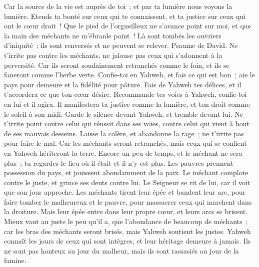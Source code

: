 \begin{multicols}{2}
Car la source de la vie est auprès de toi~; et par ta lumière nous voyons la lumière.
Etends ta bonté sur ceux qui te connaissent, et ta justice sur ceux qui ont le cœur droit~!
Que le pied de l'orgueilleux ne s'avance point sur moi, et que la main des méchants ne m'ébranle point~!
Là sont tombés les ouvriers d'iniquité~; ils sont renversés et ne peuvent se relever.
\VerseOne{}Psaume de David.  Ne t'irrite pas contre les méchants, ne jalouse pas ceux qui s'adonnent à la perversité.
Car ils seront soudainement retranchés comme le foin, et ils se faneront comme l'herbe verte.
 Confie-toi en Yahweh, et fais ce qui est bon~; aie le pays pour demeure et la fidélité pour pâture.
Fais de Yahweh tes délices, et il t'accordera ce que ton cœur désire.
 Recommande tes voies à Yahweh, confie-toi en lui et il agira.
Il manifestera ta justice comme la lumière, et ton droit comme le soleil à son midi.
 Garde le silence devant Yahweh, et tremble devant lui. Ne t'irrite point contre celui qui réussit dans ses voies, contre celui qui vient à bout de ses mauvais desseins.
 Laisse la colère, et abandonne la rage~; ne t'irrite pas pour faire le mal.
Car les méchants seront retranchés, mais ceux qui se confient en Yahweh hériteront la terre.
 Encore un peu de temps, et le méchant ne sera plus~; tu regardes le lieu où il était et il n'y est plus.
Les pauvres prennent possession du pays, et jouissent abondamment de la paix.
 Le méchant complote contre le juste, et grince ses dents contre lui.
Le Seigneur se rit de lui, car il voit que son jour approche.
 Les méchants tirent leur épée et bandent leur arc, pour faire tomber le malheureux et le pauvre, pour massacrer ceux qui marchent dans la droiture.
Mais leur épée entre dans leur propre cœur, et leurs arcs se brisent.
 Mieux vaut au juste le peu qu'il a, que l'abondance de beaucoup de méchants~;
car les bras des méchants seront brisés, mais Yahweh soutient les justes.
 Yahweh connaît les jours de ceux qui sont intègres, et leur héritage demeure à jamais.
Ils ne sont pas honteux au jour du malheur, mais ils sont rassasiés au jour de la famine.

\end{multicols}
